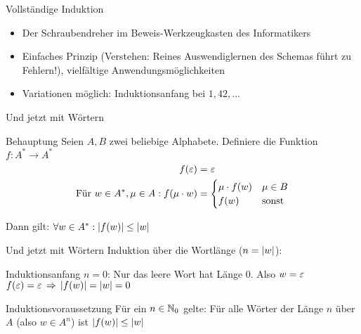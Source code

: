 \begin{frame}{Vollständige Induktion}
	\begin{itemize}
		\item Der Schraubendreher im Beweis-Werkzeugkasten des Informatikers
		\item Einfaches Prinzip (Verstehen: Reines Auswendiglernen des Schemas führt zu Fehlern!), vielfältige Anwendungsmöglichkeiten
		\item Variationen möglich: Induktionsanfang bei $1, 42, ...$
	\end{itemize}
	
\end{frame}




\begin{frame}{Und jetzt mit Wörtern}
	\begin{block}{Behauptung}
		Seien $A, B$ zwei beliebige Alphabete. Definiere die Funktion $f: A^* \to A^*$
		\begin{align*}
			f(\varepsilon) &= \varepsilon \\
			\text{Für } w \in A^*, \mu \in A: f(\mu \cdot w) &= 
			\begin{cases}
				\mu \cdot f(w) &\mu \in B \\
				f(w) &\text{sonst}
			\end{cases}\\
		\end{align*}
	
	Dann gilt: $\forall w \in A^*: \left\lvert f(w) \right\rvert \le \left\lvert w \right\rvert$
	\end{block}
\end{frame}

\begin{frame}{Und jetzt mit Wörtern}
	Induktion über die Wortlänge ($n = \left\lvert w \right\rvert$):\\[0.5em]
	\begin{block}{Induktionsanfang}
		$n = 0$: Nur das leere Wort hat Länge 0. Also $w = \varepsilon$\\
		$f(\eps) = \eps \impl \size{f(w)} = \size w = 0$
	\end{block}
	\begin{block}{Induktionsvoraussetzung}
		Für ein $n \in \mathbb{N}_0$ gelte: Für alle Wörter der Länge $n$ über $A$ (also $w \in A^n$) ist $\left\lvert f(w) \right\rvert \le \left\lvert w \right\rvert$
	\end{block}
\end{frame}

